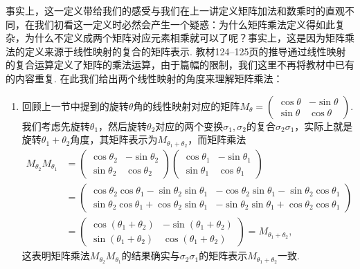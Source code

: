事实上，这一定义带给我们的感受与我们在上一讲定义矩阵加法和数乘时的直观不同，在我们初看这一定义时必然会产生一个疑惑：为什么矩阵乘法定义得如此复杂，为什么不定义成两个矩阵对应元素相乘就可以了呢？事实上，这是因为矩阵乘法的定义来源于线性映射的复合的矩阵表示. 教材124--125页的推导通过线性映射的复合运算定义了矩阵的乘法运算，由于篇幅的限制，我们这里不再将教材中已有的内容重复. 在此我们给出两个线性映射的角度来理解矩阵乘法：
\begin{enumerate}
    \item 回顾上一节中提到的旋转$\theta$角的线性映射对应的矩阵$M_{\theta}=\begin{pmatrix}
                  \cos\theta & -\sin\theta \\
                  \sin\theta & \cos\theta
              \end{pmatrix}$. 我们考虑先旋转$\theta_1$，然后旋转$\theta_2$对应的两个变换$\sigma_1,\sigma_2$的复合$\sigma_2\sigma_1$，实际上就是旋转$\theta_1+\theta_2$角度，其矩阵表示为$M_{\theta_1+\theta_2}$，而矩阵乘法
          \begin{align*}
              M_{\theta_2}M_{\theta_1}
               & =\begin{pmatrix}
                      \cos\theta_2 & -\sin\theta_2 \\
                      \sin\theta_2 & \cos\theta_2
                  \end{pmatrix}\begin{pmatrix}
                                   \cos\theta_1 & -\sin\theta_1 \\
                                   \sin\theta_1 & \cos\theta_1
                               \end{pmatrix}                                                              \\
               & =\begin{pmatrix}
                      \cos\theta_2\cos\theta_1-\sin\theta_2\sin\theta_1 & -\cos\theta_2\sin\theta_1-\sin\theta_2\cos\theta_1 \\
                      \sin\theta_2\cos\theta_1+\cos\theta_2\sin\theta_1 & -\sin\theta_2\sin\theta_1+\cos\theta_2\cos\theta_1
                  \end{pmatrix} \\
               & =\begin{pmatrix}
                      \cos(\theta_1+\theta_2) & -\sin(\theta_1+\theta_2) \\
                      \sin(\theta_1+\theta_2) & \cos(\theta_1+\theta_2)
                  \end{pmatrix}=M_{\theta_1+\theta_2},
          \end{align*}
          这表明矩阵乘法$M_{\theta_2}M_{\theta_1}$的结果确实与$\sigma_2\sigma_1$的矩阵表示$M_{\theta_1+\theta_2}$一致.


\end{enumerate}

